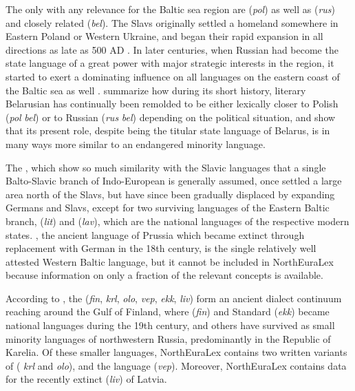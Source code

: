 The only  with any relevance for the Baltic sea region are  (\textit{pol}) as well as  (\textit{rus}) and closely related  (\textit{bel}). The Slavs originally settled a homeland somewhere in Eastern Poland or Western Ukraine, and began their rapid expansion in all directions as late as 500 AD \citep{kobylinski2005}. In later centuries, when Russian had become the state language of a great power with major strategic interests in the region, it started to exert a dominating influence on all languages on the eastern coast of the Baltic sea as well \citep{decsy1988}. \cite{smolicz_radzik_2004} summarize how during its short history, literary Belarusian has continually been remolded to be either lexically closer to Polish (\textit{pol} \arrowOA \textit{bel}) or to Russian (\textit{rus} \arrowOA \textit{bel}) depending on the political situation, and show that its present role, despite being the titular state language of Belarus, is in many ways more
similar to an endangered minority language.

The , which show so much similarity with the Slavic languages that a single Balto-Slavic branch of Indo-European is generally assumed, once settled a large area north of the Slavs, but have since been gradually displaced by expanding Germans and Slavs, except for two surviving languages of the Eastern Baltic branch,  (\textit{lit}) and  (\textit{lav}), which are the national languages of the respective modern states. , the ancient language of Prussia which became extinct through replacement with German in the 18th century, is the single relatively well attested Western Baltic language, but it cannot be included in NorthEuraLex because information on only a fraction of the relevant concepts is available.

According to \cite{viitso1998}, the  (\textit{fin}, \textit{krl}, \textit{olo}, \textit{vep}, \textit{ekk}, \textit{liv}) form an ancient dialect continuum reaching around the Gulf of Finland, where  (\textit{fin}) and Standard  (\textit{ekk}) became national languages during the 19th century, and others have survived as small minority languages of northwestern Russia, predominantly in the Republic of Karelia. Of these smaller languages, NorthEuraLex contains two written variants of  ( \textit{krl} and  \textit{olo}), and the  language (\textit{vep}). Moreover, NorthEuraLex contains data for the recently extinct  (\textit{liv}) of Latvia.

